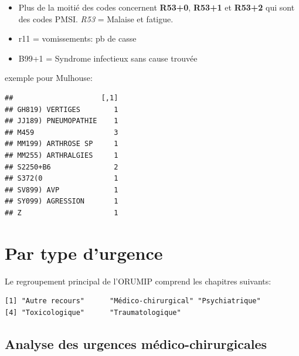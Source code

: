 \documentclass[]{article}
\newenvironment{Shaded}{\begin{snugshade}}{\end{snugshade}}
\newcommand{\KeywordTok}[1]{\textcolor[rgb]{0.13,0.29,0.53}{\textbf{{#1}}}}
\newcommand{\StringTok}[1]{\textcolor[rgb]{0.31,0.60,0.02}{{#1}}}
\newcommand{\NormalTok}[1]{{#1}}
\begin{document}
\begin{itemize}
\itemsep1pt\parskip0pt
\item
  Plus de la moitié des codes concernent \textbf{R53+0}, \textbf{R53+1}
  et \textbf{R53+2} qui sont des codes PMSI. \emph{R53} = Malaise et
  fatigue.
\item
  r11 = vomissements: pb de casse
\item
  B99+1 = Syndrome infectieux sans cause trouvée
\end{itemize}

exemple pour Mulhouse:

\begin{Shaded}
\end{Shaded}

\begin{verbatim}
##                     [,1]
## GH819) VERTIGES        1
## JJ189) PNEUMOPATHIE    1
## M459                   3
## MM199) ARTHROSE SP     1
## MM255) ARTHRALGIES     1
## S2250+B6               2
## S372(0                 1
## SV899) AVP             1
## SY099) AGRESSION       1
## Z                      1
\end{verbatim}

\section{Par type d'urgence}\label{par-type-durgence}

Le regroupement principal de l'ORUMIP comprend les chapitres suivants:

\begin{verbatim}
[1] "Autre recours"      "Médico-chirurgical" "Psychiatrique"     
[4] "Toxicologique"      "Traumatologique"   
\end{verbatim}

\subsection{Analyse des urgences
médico-chirurgicales}\label{analyse-des-urgences-medico-chirurgicales}
\end{document}

